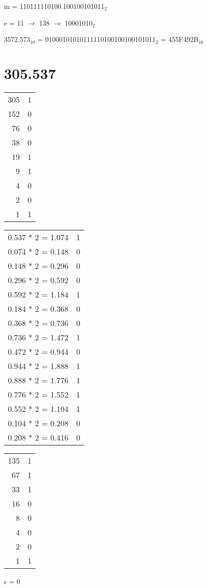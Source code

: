 \documentclass{article}
\begin{document}
m = 110111110100.100100101011$_2$

e = 11 $\rightarrow$ 138 $\rightarrow$ 10001010$_2$

3572.573$_{10}$ = 01000101010111110100100100101011$_2$ = 455F492B$_{16}$\pagebreak

\section{305.537}\begin{multicols}{3}\begin{center}
\begin{tabular}{r | l}
305&1\\
152&0\\
76&0\\
38&0\\
19&1\\
9&1\\
4&0\\
2&0\\
1&1\\
\end{tabular}

\begin{tabular}{r | l}
0.537 * 2 = 1.074&1\\
0.074 * 2 = 0.148&0\\
0.148 * 2 = 0.296&0\\
0.296 * 2 = 0.592&0\\
0.592 * 2 = 1.184&1\\
0.184 * 2 = 0.368&0\\
0.368 * 2 = 0.736&0\\
0.736 * 2 = 1.472&1\\
0.472 * 2 = 0.944&0\\
0.944 * 2 = 1.888&1\\
0.888 * 2 = 1.776&1\\
0.776 * 2 = 1.552&1\\
0.552 * 2 = 1.104&1\\
0.104 * 2 = 0.208&0\\
0.208 * 2 = 0.416&0\\
\end{tabular}

\begin{tabular}{r | l}
135&1\\
67&1\\
33&1\\
16&0\\
8&0\\
4&0\\
2&0\\
1&1\\
\end{tabular}
\end{center}\end{multicols}
s = 0
\end{document}
